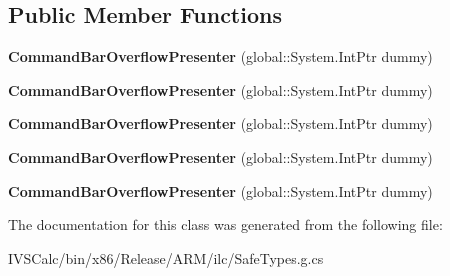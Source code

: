 \subsection*{Public Member Functions}
\begin{DoxyCompactItemize}
\item 
\mbox{\label{class_windows_1_1_u_i_1_1_xaml_1_1_controls_1_1_command_bar_overflow_presenter_a7035602f4e8679c077786dba39bd917d}} 
{\bfseries Command\+Bar\+Overflow\+Presenter} (global\+::\+System.\+Int\+Ptr dummy)
\item 
\mbox{\label{class_windows_1_1_u_i_1_1_xaml_1_1_controls_1_1_command_bar_overflow_presenter_a7035602f4e8679c077786dba39bd917d}} 
{\bfseries Command\+Bar\+Overflow\+Presenter} (global\+::\+System.\+Int\+Ptr dummy)
\item 
\mbox{\label{class_windows_1_1_u_i_1_1_xaml_1_1_controls_1_1_command_bar_overflow_presenter_a7035602f4e8679c077786dba39bd917d}} 
{\bfseries Command\+Bar\+Overflow\+Presenter} (global\+::\+System.\+Int\+Ptr dummy)
\item 
\mbox{\label{class_windows_1_1_u_i_1_1_xaml_1_1_controls_1_1_command_bar_overflow_presenter_a7035602f4e8679c077786dba39bd917d}} 
{\bfseries Command\+Bar\+Overflow\+Presenter} (global\+::\+System.\+Int\+Ptr dummy)
\item 
\mbox{\label{class_windows_1_1_u_i_1_1_xaml_1_1_controls_1_1_command_bar_overflow_presenter_a7035602f4e8679c077786dba39bd917d}} 
{\bfseries Command\+Bar\+Overflow\+Presenter} (global\+::\+System.\+Int\+Ptr dummy)
\end{DoxyCompactItemize}


The documentation for this class was generated from the following file\+:\begin{DoxyCompactItemize}
\item 
I\+V\+S\+Calc/bin/x86/\+Release/\+A\+R\+M/ilc/Safe\+Types.\+g.\+cs\end{DoxyCompactItemize}
